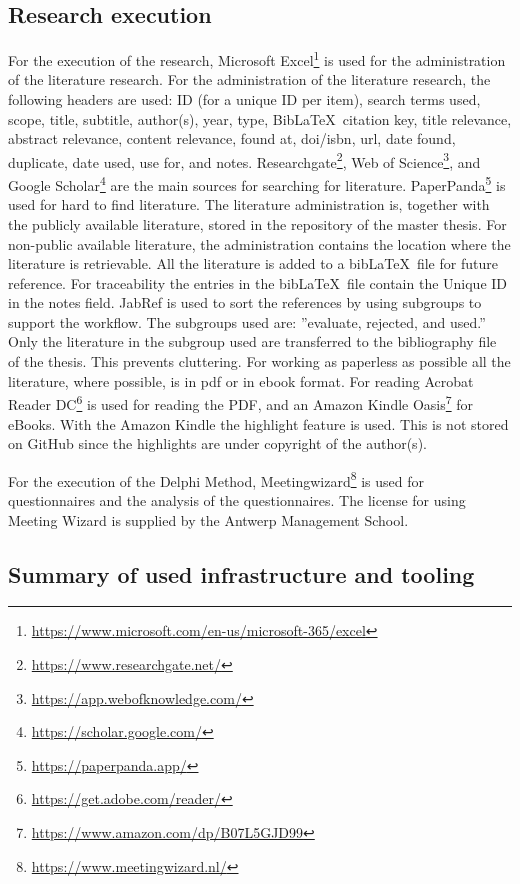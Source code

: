\subsection{Research execution}
\label{sub:tbresearchexecution}
For the execution of the research, Microsoft Excel\footnote{\url{https://www.microsoft.com/en-us/microsoft-365/excel}} is used for the administration of the literature research. For the administration of the literature research, the following headers are used: ID (for a unique ID per item), search terms used, scope, title, subtitle, author(s), year, type, Bib\LaTeX\ citation key, title relevance, abstract relevance, content relevance, found at, doi/isbn, url, date found, duplicate, date used, use for, and notes. Researchgate\footnote{\url{https://www.researchgate.net/}}, Web of Science\footnote{\url{https://app.webofknowledge.com/}}, and Google Scholar\footnote{\url{https://scholar.google.com/}} are the main sources for searching for literature. PaperPanda\footnote{\url{https://paperpanda.app/}} is used for hard to find literature. The literature administration is, together with the publicly available literature, stored in the repository of the master thesis. For non-public available literature, the administration contains the location where the literature is retrievable. All the literature is added to a bib\LaTeX\ file for future reference. For traceability the entries in the bib\LaTeX\ file contain the Unique ID in the notes field. JabRef is used to sort the references by using subgroups to support the workflow. The subgroups used are: ''evaluate, rejected, and used.'' Only the literature in the subgroup used are transferred to the bibliography file of the thesis. This prevents cluttering. For working as paperless as possible all the literature, where possible, is in pdf or in ebook format. For reading Acrobat Reader DC\footnote{\url{https://get.adobe.com/reader/}} is used for reading the PDF, and an Amazon Kindle Oasis\footnote{\url{https://www.amazon.com/dp/B07L5GJD99}} for eBooks. With the Amazon Kindle the highlight feature is used. This is not stored on GitHub since the highlights are under copyright of the author(s).\par
For the execution of the Delphi Method, Meetingwizard\footnote{\url{https://www.meetingwizard.nl/}} is used for questionnaires and the analysis of the questionnaires. The license for using Meeting Wizard is supplied by the Antwerp Management School.

\subsection{Summary of used infrastructure and tooling}

